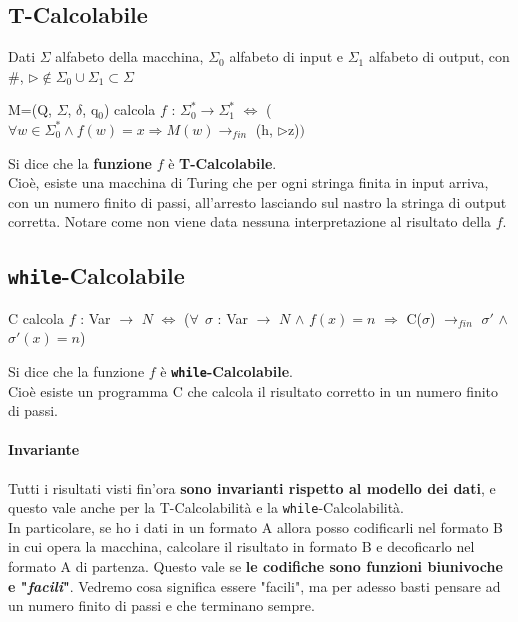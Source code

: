 \documentclass[10pt]{book}
\begin{document}
\subsection{T-Calcolabile}
Dati $\Sigma$ alfabeto della macchina, $\Sigma_0$ alfabeto di input e $\Sigma_1$ alfabeto di output, con \#, $\triangleright \not\in \Sigma_0 \cup \Sigma_1 \subset \Sigma$
\begin{center}
M=(Q, $\Sigma$, $\delta$, q$_0$) calcola $f$ : $\Sigma_0^* \longrightarrow \Sigma_1^*$ $\Leftrightarrow$ ($\forall w \in \Sigma_0^* \wedge f(w) = x \Rightarrow M(w) \rightarrow_{fin}$ (h, $\triangleright$z)$)$
\end{center}
Si dice che la \textbf{funzione} $f$ è \textbf{T-Calcolabile}.\\
Cioè, esiste una macchina di Turing che per ogni stringa finita in input arriva, con un numero finito di passi, all'arresto lasciando sul nastro la stringa di output corretta. Notare come non viene data nessuna interpretazione al risultato della $f$.
\subsection{\texttt{while}-Calcolabile}
\begin{center}
C calcola $f$ : Var $\rightarrow$ $N$ $\Leftrightarrow$ ($\forall\:\: \sigma$ : Var $\rightarrow$ $N$ $\wedge$ $f(x) = n$ $\Rightarrow$ C($\sigma$) $\rightarrow_{fin}$ $\sigma'$ $\wedge$ $\sigma'(x) = n$)
\end{center}
Si dice che la funzione $f$ è \textbf{\texttt{while}-Calcolabile}.\\
Cioè esiste un programma C che calcola il risultato corretto in un numero finito di passi.
\paragraph{Invariante} Tutti i risultati visti fin'ora \textbf{sono invarianti rispetto al modello dei dati}, e questo vale anche per la T-Calcolabilità e la \texttt{while}-Calcolabilità.\\
In particolare, se ho i dati in un formato A allora posso codificarli nel formato B in cui opera la macchina, calcolare il risultato in formato B e decoficarlo nel formato A di partenza. Questo vale se \textbf{le codifiche sono funzioni biunivoche e "\textit{facili}"}. Vedremo cosa significa essere "facili", ma per adesso basti pensare ad un numero finito di passi e che terminano sempre.
\end{document}
